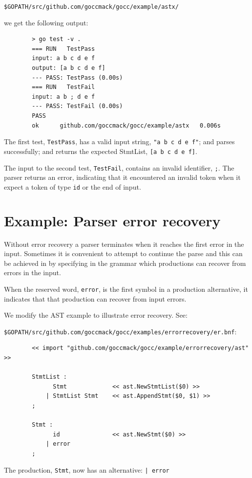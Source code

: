 \documentclass[12pt]{article}
\begin{document}
	\verb|$GOPATH/src/github.com/goccmack/gocc/example/astx/|

	we get the following output:

	\begin{verbatim}
		> go test -v .
		=== RUN   TestPass
		input: a b c d e f
		output: [a b c d e f]
		--- PASS: TestPass (0.00s)
		=== RUN   TestFail
		input: a b ; d e f
		--- PASS: TestFail (0.00s)
		PASS
		ok      github.com/goccmack/gocc/example/astx   0.006s	\end{verbatim}

	The first test, \verb"TestPass", has a valid input string, \verb|"a b c d e f"|; and parses successfully; and returns the expected StmtList, \verb|[a b c d e f]|.

	The input to the second test, \verb|TestFail|, contains an invalid identifier, \verb|;|. The parser returns an error, indicating that it encountered an invalid token when it expect a token of type \verb|id| or the end of input.

\section{Example: Parser error recovery} \label{sec:error recovery}
	Without error recovery a \gocc parser terminates when it reaches the first error in the input. Sometimes it is convenient to attempt to continue the parse and this can be achieved in \gocc by specifying in the grammar which productions can recover from errors in the input.

	When the \gocc reserved word, \verb|error|, is the first symbol in a production alternative, it indicates that that production can recover from input errors.

	We modify the AST example to illustrate error recovery. See:

	\verb|$GOPATH/src/github.com/goccmack/gocc/examples/errorrecovery/er.bnf|:

	\begin{verbatim}
		<< import "github.com/goccmack/gocc/example/errorrecovery/ast" >>

		StmtList :
		      Stmt             << ast.NewStmtList($0) >>
		    | StmtList Stmt    << ast.AppendStmt($0, $1) >>
		;

		Stmt :
		      id               << ast.NewStmt($0) >>
		    | error
		;
	\end{verbatim}

	The production, \verb|Stmt|, now has an alternative: \verb"| error"
\end{document}
